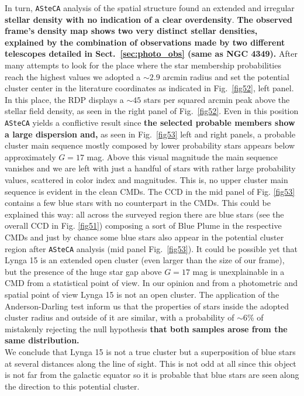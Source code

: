 \documentclass[referee]{aa}
\begin{document}
In turn, \texttt{ASteCA} analysis of the spatial structure found an extended and
irregular \textbf{stellar density with no indication of a clear overdensity}.
\textbf{The observed frame's density map shows two very distinct stellar
densities, explained by the combination of observations made by two different
telescopes detailed in Sect.~\ref{sec:photo_obs} (same as NGC 4349).}
%
After many attempts to look for the place where the star membership
probabilities reach the highest values we adopted a $\sim2.9$ arcmin radius and
set the potential cluster center in the literature coordinates as indicated in
Fig.~\ref{fig52}, left panel. In this place, the RDP displays a $\sim45$ stars
per squared arcmin peak above the stellar field density, as seen in the right
panel of Fig.~\ref{fig52}.
%
Even in this position \texttt{ASteCA} yields a conflictive result
since \textbf{the selected probable members show a large dispersion and,} as
seen in Fig.~\ref{fig53} left and right panels, a probable cluster main
sequence mostly composed by lower probability stars appears below approximately
$G=17$ mag.
Above this visual magnitude the main sequence vanishes and we are left with
just a handful of stars with rather large probability values, scattered in
color index and magnitudes. This is, no upper cluster main sequence is
evident in the clean CMDs.
%
The CCD in the mid panel of Fig. \ref{fig53} contains a few blue stars with no
counterpart in the CMDs. This could be explained this way: all across the
surveyed region there are blue stars (see the overall CCD in Fig. \ref{fig51})
composing a sort of Blue Plume in the respective CMDs and just by chance some
blue stars also appear in the potential cluster region after \texttt{ASteCA}
analysis (mid panel Fig.~\ref{fig53}). It could be possible yet that Lynga 15
is an extended open cluster (even larger than the size of our frame), but the
presence of the huge star gap above $G=17$ mag is unexplainable in a CMD from a
statistical point of view.
%
In our opinion and from a photometric and spatial point of view Lynga 15 is not
an open cluster. The application of the Anderson-Darling test inform us that
the properties of stars inside the adopted cluster radius and outside of it are
similar, with a probability of $\sim$6\% of mistakenly rejecting the null
hypothesis \textbf{that both samples arose from the same distribution.}\\

We conclude that Lynga 15 is not a true cluster but a superposition of blue
stars at several distances along the line of sight.
This is not odd at all since this object is not far from the galactic equator
so it is probable that blue stars are seen along the direction to this
potential cluster.
\end{document}
